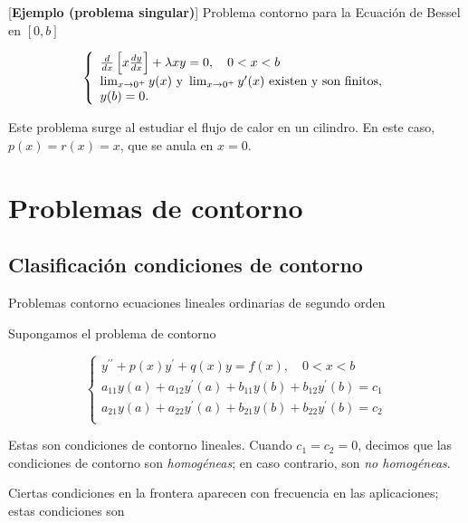 
  \begin{ejemplo}{}[\textbf{Ejemplo (problema singular)}] Problema contorno para la Ecuación de Bessel en $[0,b]$

\[
 \left\{
        \begin{array}{l}
         \frac{d}{d x}\left[x \frac{d y}{d x}\right]+\lambda x y=0, \quad 0<x<b\\
         \lim _{x \rightarrow 0^{+}} y(x)\hbox{ y }\lim _{x \rightarrow 0^{+}} y^{\prime}(x) \hbox{ existen y son finitos},\\ 
         y(b)=0 .\\         
        \end{array}
 \right.
\]

Este problema surge al estudiar el flujo de calor en un cilindro. En este caso, $p(x)=r(x)=x$, que se anula en $x=0$. 
\end{ejemplo}
 

\section{Problemas de contorno} 
 
\subsection{Clasificación condiciones de contorno}
 
{Problemas contorno ecuaciones lineales ordinarias de segundo orden}

Supongamos el problema de contorno

\[
 \left\{
        \begin{array}{l}
            y^{\prime \prime}+p(x) y^{\prime}+q(x) y=f(x), \quad 0<x<b\\
            a_{11} y(a)+a_{12} y^{\prime}(a)+b_{11} y(b)+b_{12} y^{\prime}(b)=c_{1}\\
            a_{21} y(a)+a_{22} y^{\prime}(a)+b_{21} y(b)+b_{22} y^{\prime}(b)=c_{2}\\ 
         \end{array}
 \right.
\]

Estas son condiciones de contorno lineales. Cuando $c_{1}=c_{2}=0$, decimos que las condiciones de contorno  son \emph{homogéneas}; en caso contrario, son \emph{no homogéneas}.

 
Ciertas condiciones en la frontera aparecen con frecuencia en las aplicaciones; estas condiciones son

